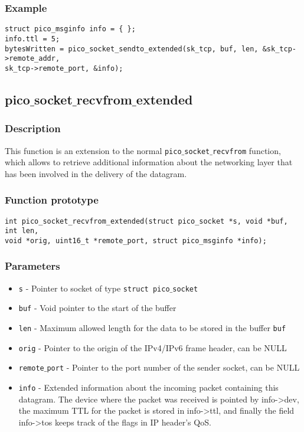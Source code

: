 \subsubsection*{Example}
\begin{verbatim}
struct pico_msginfo info = { };
info.ttl = 5;
bytesWritten = pico_socket_sendto_extended(sk_tcp, buf, len, &sk_tcp->remote_addr,
sk_tcp->remote_port, &info);
\end{verbatim}


\subsection{pico$\_$socket$\_$recvfrom$\_$extended}

\subsubsection*{Description}
This function is an extension to the normal \texttt{pico$\_$socket$\_$recvfrom} function, which allows to retrieve additional information about the networking layer that has been involved in the delivery of the datagram.

\subsubsection*{Function prototype}
\begin{verbatim}
int pico_socket_recvfrom_extended(struct pico_socket *s, void *buf, int len,
void *orig, uint16_t *remote_port, struct pico_msginfo *info);
\end{verbatim}

\subsubsection*{Parameters}
\begin{itemize}[noitemsep]
\item \texttt{s} - Pointer to socket of type \texttt{struct pico$\_$socket}
\item \texttt{buf} - Void pointer to the start of the buffer
\item \texttt{len} - Maximum allowed length for the data to be stored in the buffer \texttt{buf}
\item \texttt{orig} - Pointer to the origin of the IPv4/IPv6 frame header, can be NULL
\item \texttt{remote$\_$port} - Pointer to the port number of the sender socket, can be NULL
\item \texttt{info} - Extended information about the incoming packet containing this datagram. The device where the packet was received is pointed by info->dev, the maximum TTL for the packet is stored in info->ttl, and finally the field info->tos keeps track of the flags in IP header's QoS.
\end{itemize}

